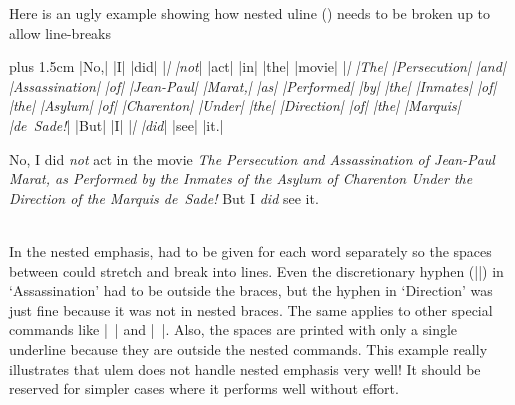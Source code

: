 \documentclass[12pt]{ltxdoc}
\begin{document}
\medskip
Here is an ugly example showing how nested uline () needs
to be broken up to allow line-breaks\\[2pt]
\begin{minipage}[t]{.5\linewidth}
\ttfamily \rightskip=0pt plus 1.5cm 
|No,| |I| |did| |{\em| |not}| |act| |in| |the| |movie| |{\em| |\emph{The}|
|\emph{Persecution}| |\emph{and}| |\emph{Assassin}\-\emph{ation}| |\emph{of}|
|\emph{Jean-Paul}| |\emph{Marat},| |as| |Per\-formed| |by| |the| |Inmates|
|of| |the| |Asylum| |of| |Charenton| |Under| |the| |Direc\-tion| |of| |the|
|Marquis| |de~Sade!}| |But| |I| |{\em| |did}| |see| |it.|\\\mbox{}
\end{minipage}\hfill
\begin{minipage}[t]{.43\linewidth}
No, I did {\em not} act in the movie {\em \emph{The} 
\emph{Persecution} \emph{and} \emph{Assassin}\-\emph{ation} \emph{of}
\emph{Jean-Paul} \emph{Marat}, as Per\-formed by the Inmates
of the Asylum of Charenton Under the Direc\-tion of the
Marquis de~Sade!} But I {\em did} see it.
\end{minipage}\\
In the nested emphasis,  had to be given for each word separately
so the spaces between could stretch and break into lines.  Even the
discretionary hyphen (|\-|) in `Assassination' had to be outside the braces,
but the hyphen in `Direction' was just fine because it was not in nested
braces. The same applies to other special commands like |\ | and |~|. Also,
the spaces are printed with only a single underline because they are
outside the nested  commands.  This example really illustrates that
ulem does not handle nested emphasis very well!  It should be reserved for
simpler cases where it performs well without effort.
\end{document}
